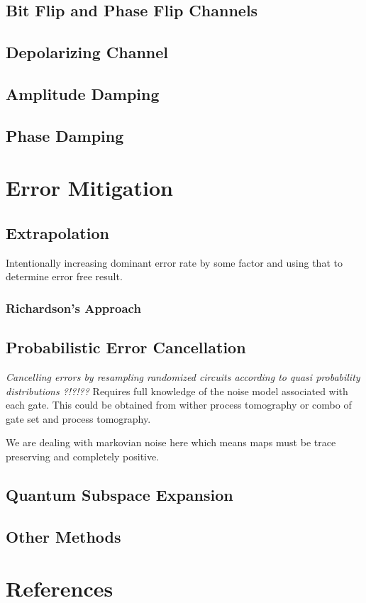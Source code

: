 \documentclass{article}
\begin{document}
\subsection{Bit Flip and Phase Flip Channels}
\subsection{Depolarizing Channel}
\subsection{Amplitude Damping}
\subsection{Phase Damping}


\section{Error Mitigation}
\subsection{Extrapolation}
Intentionally increasing dominant error rate by some factor and
using that to determine error free result.
\subsubsection{Richardson's Approach}
\subsection{Probabilistic Error Cancellation}
\textit{Cancelling errors by resampling randomized circuits
according to quasi probability distributions ?!?!??}
Requires full knowledge of the noise model associated with each gate. This
could be obtained from wither process tomography or combo of gate set and
process tomography.

We are dealing with markovian noise here which means maps must be
trace preserving and completely positive.
\subsection{Quantum Subspace Expansion}

\subsection{Other Methods}
\section{References}
\end{document}
